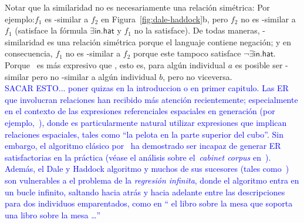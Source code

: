 Notar que la similaridad no es necesariamente una relaci\'on sim\'etrica: Por ejemplo:$f_1$ es \el-similar a $f_2$ en
Figura~\ref{fig:dale-haddock}b, pero $f_2$ no es \el-similar a $f_1$
(satisface la f\'ormula $\exists \mathsf{in}.\mathsf{hat}$ y $f_1$
no la satisface).  De todas maneras, \alc-similaridad es una relaci\'on sim\'etrica porque
el languaje contiene negaci\'on; y en consecuencia, $f_1$ no es \alc-similar
a $f_2$ porque este tampoco satisface $\neg \exists
\mathsf{in}.\mathsf{hat}$.  Porque \alc\ es m\'as expresivo que \el,
esto es, para alg\'un individual $a$ es posible ser \el-similar pero
no \alc-similar a alg\'un individual $b$, pero no viceversa.\\



\textcolor{blue}{SACAR ESTO... poner quizas en la introduccion o en primer capitulo. Las ER que involucran relaciones han recibido m\'as atenci\'on recientemente;
especialmente en el contexto de las expresiones referenciales espaciales en 
generaci\'on (por ejemplo,~\cite{kelleher06:increm}),
donde es particularmente natural utilizar expresiones que implican 
relaciones espaciales, tales como ``la pelota en la parte superior del cubo''. Sin embargo, el
algoritmo cl\'asico
por~\cite{dale91:gener} ha demostrado ser
incapaz de generar ER satisfactorias en la pr\'actica (v\'ease el an\'alisis sobre
el~\emph{cabinet corpus}
en~\cite{viethen06:_algor_for_gener_refer_expres}). Adem\'as, el
Dale y Haddock algoritmo y muchos de sus sucesores (tales
como~\cite{kelleher06:increm}) son vulnerables a
el problema de la \emph{regresi\'on infinita}, donde el algoritmo entra en un
bucle infinito, saltando hacia atr\'as y hacia adelante entre las descripciones para dos
individuos emparentados, como en `` el libro sobre la mesa que soporta una
libro sobre la mesa \ldots ''}


